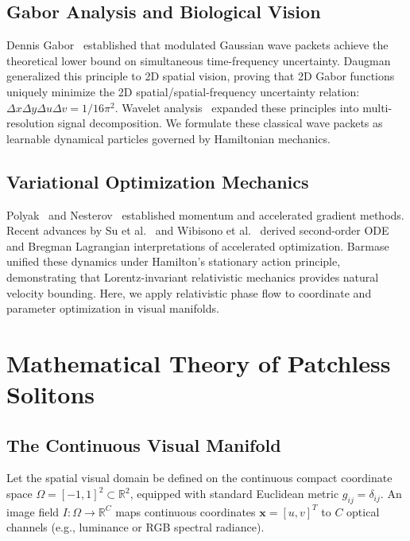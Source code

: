 \documentclass[10pt,twocolumn]{article}
\begin{document}
\subsection{Gabor Analysis and Biological Vision}
Dennis Gabor~\cite{gabor1946theory} established that modulated Gaussian wave packets achieve the theoretical lower bound on simultaneous time-frequency uncertainty. Daugman~\cite{daugman1985uncertainty} generalized this principle to 2D spatial vision, proving that 2D Gabor functions uniquely minimize the 2D spatial/spatial-frequency uncertainty relation: $\Delta x \Delta y \Delta u \Delta v = 1/16\pi^2$. Wavelet analysis~\cite{mallat1999wavelet} expanded these principles into multi-resolution signal decomposition. We formulate these classical wave packets as learnable dynamical particles governed by Hamiltonian mechanics.

\subsection{Variational Optimization Mechanics}
Polyak~\cite{polyak1964some} and Nesterov~\cite{nesterov1983method} established momentum and accelerated gradient methods. Recent advances by Su et al.~\cite{su2016differential} and Wibisono et al.~\cite{wibisono2016variational} derived second-order ODE and Bregman Lagrangian interpretations of accelerated optimization. Barmase~\cite{barmase2026variational} unified these dynamics under Hamilton's stationary action principle, demonstrating that Lorentz-invariant relativistic mechanics provides natural velocity bounding. Here, we apply relativistic phase flow to coordinate and parameter optimization in visual manifolds.

\section{Mathematical Theory of Patchless Solitons}

\subsection{The Continuous Visual Manifold}
Let the spatial visual domain be defined on the continuous compact coordinate space $\Omega = [-1, 1]^2 \subset \mathbb{R}^2$, equipped with standard Euclidean metric $g_{ij} = \delta_{ij}$. An image field $I: \Omega \to \mathbb{R}^C$ maps continuous coordinates $\mathbf{x} = [u, v]^T$ to $C$ optical channels (e.g., luminance or RGB spectral radiance).
\end{document}

